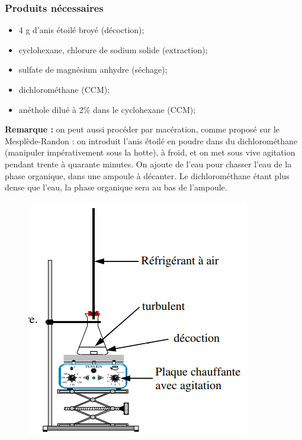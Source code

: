 \documentclass[11pt,a4paper]{report}
\begin{document}
\subsubsection*{Produits nécessaires}
\begin{itemize}
	\item 4 g d'anis étoilé broyé (décoction);
	\item cyclohexane, chlorure de sodium solide (extraction);
	\item sulfate de magnésium anhydre (séchage);
	\item dichlorométhane (CCM);
	\item anéthole dilué à 2\% dans le cyclohexane (CCM);\\
\end{itemize}

\textbf{Remarque :} on peut aussi procéder par macération, comme proposé sur le Mesplède-Randon : on introduit l'anis étoilé en poudre dans du dichlorométhane (manipuler impérativement sous la hotte), à froid, et on met sous vive agitation pendant trente à quarante minutes. On ajoute de l'eau pour chasser l'eau de la phase organique, dans une ampoule à décanter. Le dichlorométhane étant plus dense que l'eau, la phase organique sera au bas de l'ampoule.

\begin{figure}[h!]
	\begin{center}
		\includegraphics[scale=0.5]{montage_reflux.png}
	\end{center}
\end{figure}
\end{document}
